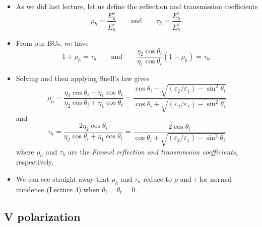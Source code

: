 \documentclass[11pt, oneside]{article}
\begin{document}
\begin{itemize}
	\item As we did last lecture, let us define the reflection and transmission coefficients
	\begin{equation}
		\rho_h = \frac{E_h^r}{E_h^i} \qquad \text{and} \qquad \tau_h = \frac{E_h^t}{E_h^i}.
	\end{equation}
	\item From our BCs, we have
	\begin{equation}
		1 + \rho_h = \tau_h \qquad \text{and} \qquad \frac{\eta_2\cos\theta_i}{\eta_1\cos\theta_t}\left(1 - \rho_h\right) = \tau_h.
	\end{equation}
	\item Solving and then applying Snell's law gives
	\begin{equation}
		\label{e:rho_h}
		\boxed{\rho_h = \frac{\eta_2\cos\theta_i - \eta_1\cos\theta_t}{\eta_2\cos\theta_i + \eta_1\cos\theta_t}
		= \frac{\cos\theta_i - \sqrt{(\varepsilon_2/\varepsilon_1) - \sin^2\theta_i}}{\cos\theta_i + \sqrt{(\varepsilon_2/\varepsilon_1) - \sin^2\theta_i}}}
	\end{equation}
	and
	\begin{equation}
		\label{e:tau_h}
		\boxed{\tau_h = \frac{2\eta_2\cos\theta_i}{\eta_2\cos\theta_i + \eta_1\cos\theta_t}
		= \frac{2\cos\theta_i}{\cos\theta_i + \sqrt{(\varepsilon_2/\varepsilon_1) - \sin^2\theta_i}}}
	\end{equation}
	where $\rho_h$ and $\tau_h$ are the \emph{Fresnel reflection and transmission coefficients}, respectively.
	\item We can see straight away that $\rho_h$ and $\tau_h$ reduce to $\rho$ and $\tau$ for normal incidence (Lecture 4) when $\theta_i = \theta_t = 0$.
\end{itemize}

\subsection{V polarization}
\end{document}
